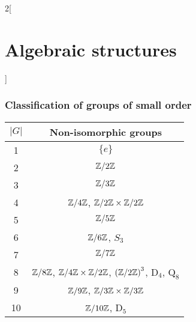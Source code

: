 \documentclass[../../../main.tex]{subfiles}
\begin{document}
\begin{multicols}{2}[\section{Algebraic structures}]
    \subsubsection{Classification of groups of small order}
    \begin{center}
        \begin{tabular}{|c|c|}
            \hline
            $|G|$ & Non-isomorphic groups                                                                                                       \\
            \hline
            1     & $\{e\}$                                                                                                                     \\
            \hline
            2     & $\quot{\ZZ}{2\ZZ}$                                                                                                          \\
            \hline
            3     & $\quot{\ZZ}{3\ZZ}$                                                                                                          \\
            \hline
            4     & $\quot{\ZZ}{4\ZZ}$, $\quot{\ZZ}{2\ZZ}\times\quot{\ZZ}{2\ZZ}$                                                                \\
            \hline
            5     & $\quot{\ZZ}{5\ZZ}$                                                                                                          \\
            \hline
            6     & $\quot{\ZZ}{6\ZZ}$, $S_3$                                                                                                   \\
            \hline
            7     & $\quot{\ZZ}{7\ZZ}$                                                                                                          \\
            \hline
            8     & $\quot{\ZZ}{8\ZZ}$, $\quot{\ZZ}{4\ZZ}\times\quot{\ZZ}{2\ZZ}$, $\left(\quot{\ZZ}{2\ZZ}\right)^3$, $\text{D}_4$, $\text{Q}_8$ \\
            \hline
            9     & $\quot{\ZZ}{9\ZZ}$, $\quot{\ZZ}{3\ZZ}\times\quot{\ZZ}{3\ZZ}$                                                                \\
            \hline
            10    & $\quot{\ZZ}{10\ZZ}$, $\text{D}_5$                                                                                           \\

\end{tabular}
\end{center}
\end{multicols}
\end{document}
